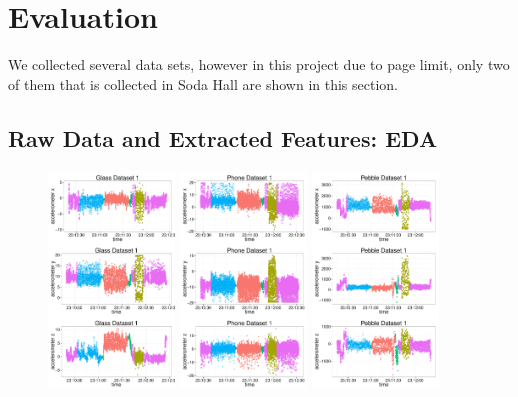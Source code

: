 
\section{Evaluation}

We collected several data sets, however in this project due to page limit, only two of them that is collected in Soda Hall are shown in this section.

\label{sec:evaluation}

\subsection{Raw Data and Extracted Features: EDA}


\begin{figure}
  \centering
  \includegraphics[width=0.3\textwidth]{figures/eda_soda1_glass.pdf}
  \includegraphics[width=0.3\textwidth]{figures/eda_soda1_phone.pdf}
  \includegraphics[width=0.3\textwidth]{figures/eda_soda1_pebble.pdf}

\end{figure}

